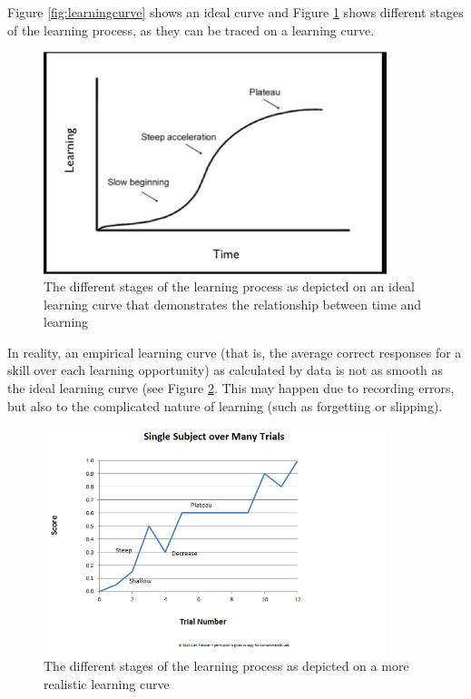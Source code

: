 \documentclass[
]{book}
\begin{document}
Figure \ref{fig:learningcurve} shows an ideal curve and Figure \ref{fig:learningcurvestages} shows different stages of the learning process, as they can be traced on a learning curve.

\begin{figure}
\includegraphics[width=10cm]{./images/learningcurvestages} \caption{The different stages of the learning process as depicted on an ideal learning curve that demonstrates the relationship between time and learning}\label{fig:learningcurvestages}
\end{figure}

In reality, an empirical learning curve (that is, the average correct responses for a skill over each learning opportunity) as calculated by data is not as smooth as the ideal learning curve (see Figure \ref{fig:empiricallearningcurve}. This may happen due to recording errors, but also to the complicated nature of learning (such as forgetting or slipping).

\begin{figure}
\includegraphics[width=10cm]{./images/empiricallearningcurve} \caption{The different stages of the learning process as depicted on a more realistic learning curve}\label{fig:empiricallearningcurve}
\end{figure}
\end{document}
